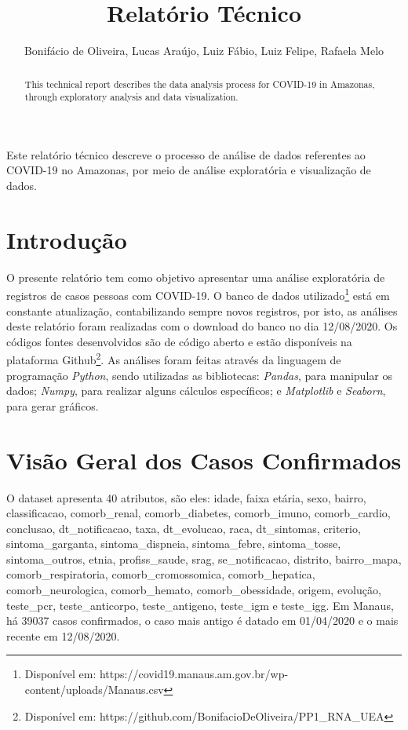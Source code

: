 \documentclass[12pt]{article}
\title{Relatório Técnico}
\author{Bonifácio de Oliveira, Lucas Araújo, Luiz Fábio, Luiz Felipe, Rafaela Melo }
\begin{document}
 

\maketitle

\begin{abstract}
This technical report describes the data analysis process for COVID-19 in Amazonas, through exploratory analysis and data visualization.
\end{abstract}
     
\begin{resumo} 
  Este relatório técnico descreve o processo de análise de dados referentes ao COVID-19 no Amazonas, por meio de análise exploratória e visualização de dados.
\end{resumo}

\section{Introdução}
O presente relatório tem como objetivo apresentar uma análise exploratória de registros de casos pessoas com COVID-19. O banco de dados utilizado\footnote{Disponível em: https://covid19.manaus.am.gov.br/wp-content/uploads/Manaus.csv} está em constante atualização, contabilizando sempre novos registros, por isto, as análises deste relatório foram realizadas com o download do banco no dia 12/08/2020. Os códigos fontes desenvolvidos são de código aberto e estão disponíveis na plataforma Github\footnote{Disponível em: https://github.com/BonifacioDeOliveira/PP1\_RNA\_UEA}. As análises foram feitas através da linguagem de programação \textit{Python}, sendo utilizadas as bibliotecas: \textit{Pandas}, para manipular os dados; \textit{Numpy}, para realizar alguns cálculos específicos; e \textit{Matplotlib} e \textit{Seaborn}, para gerar gráficos.

\section{Visão Geral dos Casos Confirmados}

O dataset apresenta 40 atributos, são eles: idade, faixa etária, sexo, bairro, classificacao, comorb\_renal, comorb\_diabetes, comorb\_imuno, comorb\_cardio, conclusao, dt\_notificacao, taxa, dt\_evolucao, raca, dt\_sintomas, criterio, sintoma\_garganta, sintoma\_dispneia, sintoma\_febre, sintoma\_tosse, sintoma\_outros, etnia, profiss\_saude, srag, se\_notificacao, distrito, bairro\_mapa, comorb\_respiratoria, comorb\_cromossomica, comorb\_hepatica, comorb\_neurologica, comorb\_hemato, comorb\_obessidade, origem, evolução, teste\_pcr, teste\_anticorpo, teste\_antigeno, teste\_igm e teste\_igg. Em Manaus, há 39037 casos confirmados, o caso mais antigo é datado em 01/04/2020 e o mais recente em 12/08/2020.
\end{document}
